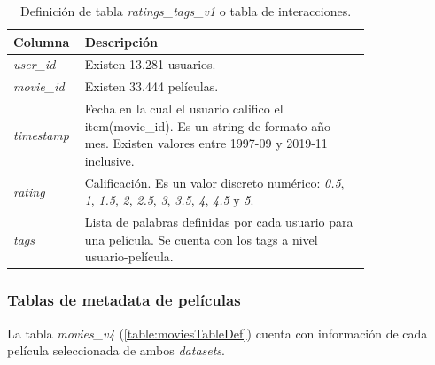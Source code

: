\documentclass[11pt,a4paper,twoside]{thesis}
\begin{document}
\begin{table}[!htb]
	\centering
	\footnotesize
	\begin{tabular}{l | p{0.8\linewidth}}
	\hline
		Columna        & Descripción \\
	\hline

	\textit{user\_id}  & Existen 13.281 usuarios. \\
	\textit{movie\_id} & Existen 33.444 películas. \\
	\textit{timestamp} & Fecha en la cual el usuario califico el item(movie\_id). Es un string de formato año-mes. Existen valores entre 1997-09 y 2019-11 inclusive. \\
	\textit{rating}    & Calificación. Es un valor discreto numérico: \textit{0.5}, \textit{1}, \textit{1.5}, \textit{2}, \textit{2.5}, \textit{3}, \textit{3.5}, \textit{4}, \textit{4.5} y \textit{5}. \\
	\textit{tags}      & Lista de palabras definidas por cada usuario para una película. Se cuenta con los tags a nivel usuario-película. \\
	\hline
	\end{tabular}
	\caption{
		Definición de tabla \textit{ratings\_tags\_v1} o tabla de interacciones.
	}
	\label{table:interactionsTableDef}
\end{table}

\subsubsection*{Tablas de metadata de películas}

La tabla \textit{movies\_v4} (\ref{table:moviesTableDef}) cuenta con información de cada película seleccionada de ambos \textit{datasets}. 
\end{document}
